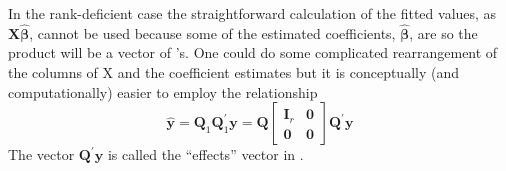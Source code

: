 \documentclass[shortnames,article,nojss]{jss}
\begin{document}
In the rank-deficient case the straightforward calculation of the
fitted values, as $\bm X\widehat{\bm\beta}$, cannot be used because
some of the estimated coefficients, $\widehat{\bm\beta}$, are 
so the product will be a vector of 's.  One could do some
complicated rearrangement of the columns of X and the coefficient
estimates but it is conceptually (and computationally) easier to
employ the relationship
\begin{displaymath}
  \widehat{\bm y} = \bm Q_1\bm Q_1^\prime\bm y=\bm Q
  \begin{bmatrix}
    \bm I_r & \bm 0\\
    \bm 0   & \bm 0
  \end{bmatrix}
  \bm Q^\prime\bm y
\end{displaymath}
The vector $\bm Q^\prime\bm y$ is called the ``effects'' vector in .
\end{document}
